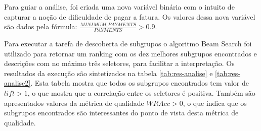 \documentclass[12pt]{article}
\begin{document}

Para guiar a análise, foi criada uma nova variável binária com o intuito de capturar a noção de dificuldade de pagar a fatura. Os valores dessa nova variável são dados pela fórmula: $\frac{MINIMUM\_PAYMENTS}{PAYMENTS} > 0.9$.

Para executar a tarefa de descoberta de subgrupos o algoritmo Beam Search foi utilizado para retornar um ranking com os dez melhores subgrupos encontrados e descrições com no máximo três seletores, para facilitar a interpretação. Os resultados da execução são sintetizados na tabela \ref{tab:res-analise} e \ref{tab:res-analise2}. Esta tabela mostra que todos os subgrupos encontrados tem valor de $lift > 1$, o que mostra que a correlação entre os seletores é positiva. Também são apresentados valores da métrica de qualidade $WRAcc > 0$, o que indica que os subgrupos encontrados são interessantes do ponto de vista desta métrica de qualidade.
\end{document}
